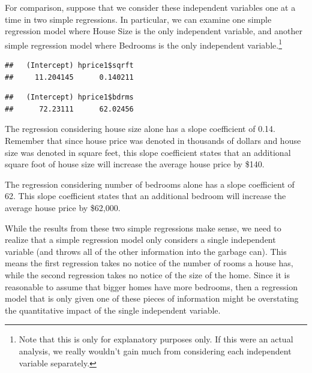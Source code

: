 \documentclass[
]{book}
\newenvironment{Shaded}{\begin{snugshade}}{\end{snugshade}}
\newcommand{\FunctionTok}[1]{\textcolor[rgb]{0.00,0.00,0.00}{#1}}
\newcommand{\NormalTok}[1]{#1}
\newcommand{\OtherTok}[1]{\textcolor[rgb]{0.56,0.35,0.01}{#1}}
\newcommand{\SpecialCharTok}[1]{\textcolor[rgb]{0.00,0.00,0.00}{#1}}
\begin{document}
For comparison, suppose that we consider these independent variables one at a time in two simple regressions. In particular, we can examine one simple regression model where House Size is the only independent variable, and another simple regression model where Bedrooms is the only independent variable.\footnote{Note that this is only for explanatory purposes only. If this were an actual analysis, we really wouldn't gain much from considering each independent variable separately.}

\begin{Shaded}
\end{Shaded}

\begin{verbatim}
##   (Intercept) hprice1$sqrft 
##     11.204145      0.140211
\end{verbatim}

\begin{Shaded}
\end{Shaded}

\begin{verbatim}
##   (Intercept) hprice1$bdrms 
##      72.23111      62.02456
\end{verbatim}

The regression considering house size alone has a slope coefficient of 0.14. Remember that since house price was denoted in thousands of dollars and house size was denoted in square feet, this slope coefficient states that an additional square foot of house size will increase the average house price by \$140.

The regression considering number of bedrooms alone has a slope coefficient of 62. This slope coefficient states that an additional bedroom will increase the average house price by \$62,000.

While the results from these two simple regressions make sense, we need to realize that a simple regression model only considers a single independent variable (and throws all of the other information into the garbage can). This means the first regression takes no notice of the number of rooms a house has, while the second regression takes no notice of the size of the home. Since it is reasonable to assume that bigger homes have more bedrooms, then a regression model that is only given one of these pieces of information might be overstating the quantitative impact of the single independent variable.
\end{document}
